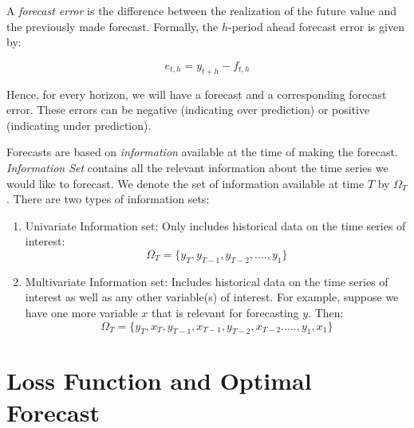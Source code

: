 \documentclass[]{book}
\theoremstyle{definition}
\theoremstyle{definition}
\theoremstyle{definition}
\theoremstyle{remark}
\let\BeginKnitrBlock\begin \let\EndKnitrBlock\end
\begin{document}
\BeginKnitrBlock{definition}[Forecast Error]
\protect\hypertarget{def:d3}{}{\label{def:d3} {} }
\EndKnitrBlock{definition}

A \emph{forecast error} is the difference between the realization of the future value and the previously made forecast. Formally, the \(h\)-period ahead forecast error is given by:

\begin{equation}
e_{t,h}=y_{t+h}-f_{t,h}
\end{equation}

Hence, for every horizon, we will have a forecast and a corresponding forecast error. These errors can be negative (indicating over prediction) or positive (indicating under prediction).

\BeginKnitrBlock{definition}[Information Set]
\protect\hypertarget{def:d4}{}{\label{def:d4} {} }
\EndKnitrBlock{definition}

Forecasts are based on \emph{information} available at the time of making the forecast. \emph{Information Set} contains all the relevant information about the time series we would like to forecast. We denote the set of information available at time \(T\) by \(\Omega_T\). There are two types of information sets:

\begin{enumerate}
\def\labelenumi{\arabic{enumi}.}
\item
  Univariate Information set: Only includes historical data on the time series of interest:
  \begin{equation}
  \Omega_T=\{y_T, y_{T-1}, y_{T-2}, ...., y_1\}
  \end{equation}
\item
  Multivariate Information set: Includes historical data on the time series of interest as well as any other variable(s) of interest. For example, suppose we have one more variable \(x\) that is relevant for forecasting \(y\). Then:
  \begin{equation}
  \Omega_T=\{y_T, x_T, y_{T-1}, x_{T-1}, y_{T-2},x_{T-2}. ...., y_1, x_1\}
  \end{equation}
\end{enumerate}

\hypertarget{loss-function-and-optimal-forecast}{%
\section{Loss Function and Optimal Forecast}\label{loss-function-and-optimal-forecast}}
\end{document}
